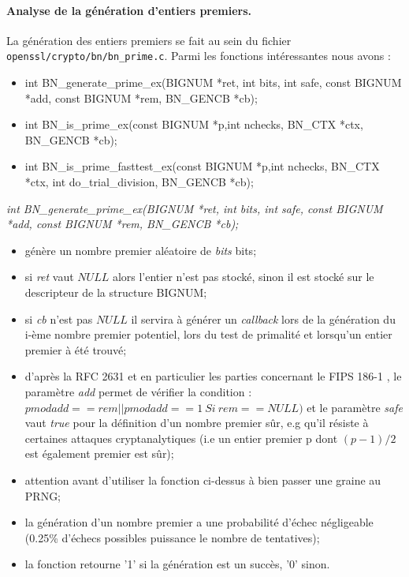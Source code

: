 			\paragraph{Analyse de la génération d'entiers premiers.\\}

			La génération des entiers premiers se fait au sein du fichier \texttt{openssl/crypto/bn/bn\_prime.c}. Parmi les fonctions intéressantes nous avons :
			\begin{itemize}
			\item int BN\_generate\_prime\_ex(BIGNUM *ret, int bits, int safe, const BIGNUM *add, const BIGNUM *rem, BN\_GENCB *cb);
			\item int BN\_is\_prime\_ex(const BIGNUM *p,int nchecks, BN\_CTX *ctx, BN\_GENCB *cb);
			\item int BN\_is\_prime\_fasttest\_ex(const BIGNUM *p,int nchecks, BN\_CTX *ctx, int do\_trial\_division, BN\_GENCB *cb);\\
			\end{itemize}

			\textit{int BN\_generate\_prime\_ex(BIGNUM *ret, int bits, int safe, const BIGNUM *add, const BIGNUM *rem, BN\_GENCB *cb);}  
			\begin{itemize}
			\item génère un nombre premier aléatoire de \textit{bits} bits; 
			\item si \textit{ret} vaut $NULL$ alors l'entier n'est pas stocké, sinon il est stocké sur le descripteur de la structure BIGNUM;
			\item si \textit{cb} n'est pas $NULL$ il servira à générer un \textit{callback} lors de la génération du i-ème nombre premier potentiel, lors du test de primalité et lorsqu'un entier premier à été trouvé;
			\item d'après la RFC 2631 \cite{rfc2631} et en particulier les parties concernant le FIPS 186-1 \cite{fips186-1}, le paramètre \textit{add} permet de vérifier la condition : $p mod add == rem || p mod add == 1 \ Si\ rem == NULL)$ et le paramètre \textit{safe} vaut \textit{true} pour la définition d'un nombre premier sûr, e.g qu'il résiste à certaines attaques cryptanalytiques (i.e un entier premier p dont $(p - 1)/2$ est également premier est sûr);
			\item attention avant d'utiliser la fonction ci-dessus à bien passer une graine au PRNG;
			\item la génération d'un nombre premier a une probabilité d'échec négligeable (0.25\% d'échecs possibles puissance le nombre de tentatives);
			\item la fonction retourne '1' si la génération est un succès, '0' sinon.\\
			\end{itemize}

